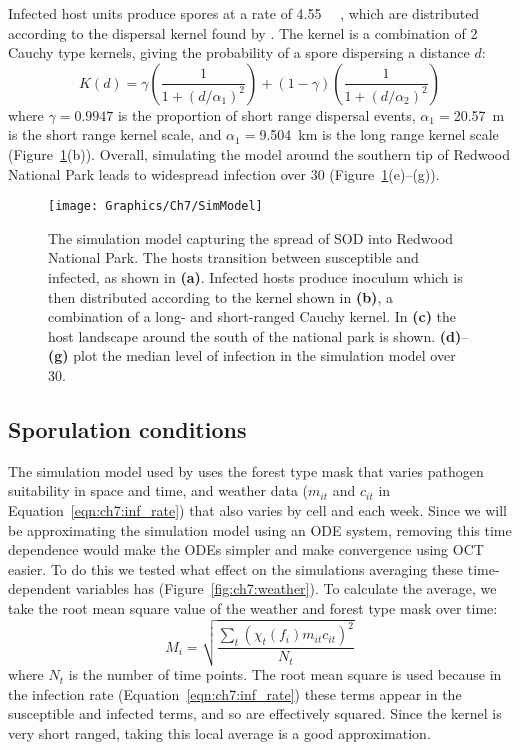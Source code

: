 Infected host units produce spores at a rate of \SI{4.55}{\per\week} \citep{cunniffe_modelling_2016}, which are distributed according to the dispersal kernel found by \citet{meentemeyer_epidemiological_2011}. The kernel is a combination of 2 Cauchy type kernels, giving the probability of a spore dispersing a distance $d$:
\begin{equation}
    K(d) = \gamma\left(\frac{1}{1+(d/\alpha_1)^2}\right) + (1-\gamma)\left(\frac{1}{1+(d/\alpha_2)^2}\right)
\end{equation}
where $\gamma=0.9947$ is the proportion of short range dispersal events, $\alpha_1=$\SI{20.57}{\meter} is the short range kernel scale, and $\alpha_1=$\SI{9.504}{\km} is the long range kernel scale (Figure~\ref{fig:ch7:sim_model}(b)). Overall, simulating the model around the southern tip of Redwood National Park leads to widespread infection over \SI{30}{\years} (Figure~\ref{fig:ch7:sim_model}(e)--(g)).

\begin{figure}
    \begin{center}
        \texttt{[image: Graphics/Ch7/SimModel]}
        \caption[Simulation model of SOD invading Redwood National Park]{The simulation model capturing the spread of SOD into Redwood National Park. The hosts transition between susceptible and infected, as shown in \textbf{(a)}. Infected hosts produce inoculum which is then distributed according to the kernel shown in \textbf{(b)}, a combination of a long- and short-ranged Cauchy kernel. In \textbf{(c)} the host landscape around the south of the national park is shown. \textbf{(d)}--\textbf{(g)} plot the median level of infection in the simulation model over \SI{30}{\years}.\label{fig:ch7:sim_model}}
    \end{center}
\end{figure}

\subsection{Sporulation conditions}

The simulation model used by \citet{meentemeyer_epidemiological_2011} uses the forest type mask that varies pathogen suitability in space and time, and weather data ($m_{it}$ and $c_{it}$ in Equation~\ref{eqn:ch7:inf_rate}) that also varies by cell and each week. Since we will be approximating the simulation model using an ODE system, removing this time dependence would make the ODEs simpler and make convergence using OCT easier. To do this we tested what effect on the simulations averaging these time-dependent variables has (Figure~\ref{fig:ch7:weather}). To calculate the average, we take the root mean square value of the weather and forest type mask over time:
\begin{equation}
    M_i = \sqrt{\frac{\sum_t\left(\chi_t(f_i)m_{it}c_{it}\right)^2}{N_t}}
\end{equation}
where $N_t$ is the number of time points. The root mean square is used because in the infection rate (Equation~\ref{eqn:ch7:inf_rate}) these terms appear in the susceptible and infected terms, and so are effectively squared. Since the kernel is very short ranged, taking this local average is a good approximation.

